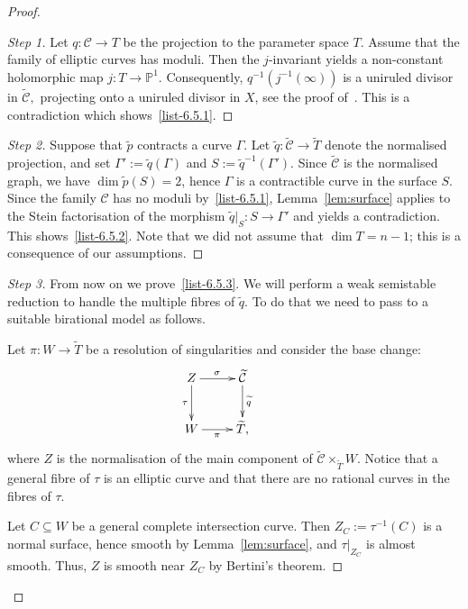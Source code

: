 \documentclass[11pt]{article}
\theoremstyle{definition}
\newenvironment{proofc}{\begin{proof}}{\end{proof}}
\numberwithin{equation}{section}
\numberwithin{figure}{section}
\numberwithin{table}{section}
\newcommand{\PS}{\mathbb{P}}
\newcommand\sC{\mathcal{C}}
\newenvironment{step}[1]{\begin{proof}[#1]}{\let\qed\relax\end{proof}}
\begin{document}
\begin{proofc}
\begin{step}{Step 1}
Let $q\colon \sC \to T$ be the projection to the parameter space $T$. Assume that the family of elliptic curves has moduli. Then the $j$-invariant yields a non-constant holomorphic map $j\colon T \to \PS^1$. Consequently, $q^{-1} (j^{-1}(\infty))$ is a uniruled divisor in $ \widetilde {\sC},$ projecting onto a uniruled divisor in $X$, see the proof of~\cite[Corollary~3.34]{Voi03}. This is a contradiction which shows~\eqref{list-6.5.1}.
\end{step}

\begin{step}{Step 2}
Suppose that $\widetilde p$ contracts a curve $\Gamma$. Let $\widetilde q\colon \widetilde { \sC} \to \widetilde T $ denote the normalised projection, and set $\Gamma' := \widetilde q(\Gamma)$ and $S:=\widetilde q^{-1}(\Gamma')$. Since $\widetilde {\sC}$ is the normalised graph, we have $\dim \widetilde p(S) = 2$, hence $\Gamma$ is a contractible curve in the surface $S$. Since the family $\sC$ has no moduli by~\eqref{list-6.5.1}, Lemma~\ref{lem:surface} applies to the Stein factorisation of the morphism $\widetilde{q}|_S\colon S\to \Gamma'$ and yields a contradiction. This shows~\eqref{list-6.5.2}. Note that we did not assume that $\dim T = n-1$; this is a consequence of our assumptions.
\end{step}

\begin{step}{Step 3}
From now on we prove~\eqref{list-6.5.3}. We will perform a weak semistable reduction to handle the multiple fibres of $\widetilde q$. To do that we need to pass to a suitable birational model as follows.

Let $\pi\colon W\to \widetilde T$ be a resolution of singularities and consider the base change:
\[
\xymatrix{ Z \ar[d]_-{\tau} \ar[r]^{\sigma} & {\widetilde {\sC}} \ar[d]^-{\widetilde q} \\
W \ar[r]_{\pi} & \widetilde T, & }
\]
where $Z$ is the normalisation of the main component of $ \widetilde {\sC} \times_{\widetilde T} W$. Notice that a general fibre of $\tau$ is an elliptic curve and that there are no rational curves in the fibres of $\tau$.

Let $C \subseteq W$ be a general complete intersection curve. Then $Z_C := \tau^{-1}(C) $ is a normal surface, hence smooth by Lemma~\ref{lem:surface}, and $\tau|_{Z_C}$ is almost smooth. Thus, $Z$ is smooth near $Z_C$ by Bertini's theorem.


\end{step}
\end{proofc}
\end{document}
